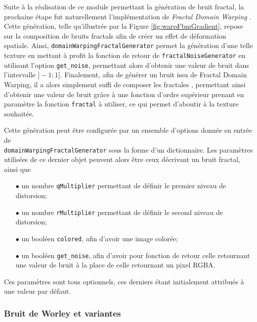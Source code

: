 \documentclass[11pt]{article}
\begin{document}
Suite à la réalisation de ce module permettant la génération de bruit fractal, la prochaine étape fut naturellement l'implémentation de \textit{Fractal Domain Warping} \cite{fractalDomainWarping}. Cette génération, telle qu'illustrée par la Figure \ref{fig:warpFbmGradient}, repose sur la composition de bruits fractals afin de créer un effet de déformation spatiale. Ainsi, \texttt{domainWarpingFractalGenerator} permet la génération d'une telle texture en mettant à profit la fonction de retour de \texttt{fractalNoiseGenerator} en utilisant l'option \texttt{get\_noise}, permettant alors d'obtenir une valeur de bruit dans l'intervalle $]-1;1[$. Finalement, afin de générer un bruit issu de Fractal Domain Warping, il a alors simplement suffi de composer les fractales \cite{fractalDomainWarping}, permettant ainsi d'obtenir une valeur de bruit grâce à une fonction d'ordre supérieur prenant en paramètre la fonction \texttt{fractal} à utiliser, ce qui permet d'aboutir à la texture souhaitée.

Cette génération peut être configurée par un ensemble d'options donnée en entrée de\\ \texttt{domainWarpingFractalGenerator} sous la forme d'un dictionnaire. Les paramètres utilisées de ce dernier objet peuvent alors être ceux décrivant un bruit fractal, ainsi que
\begin{itemize}
    \item [$\bullet$] un nombre \texttt{qMultiplier} permettant de définir le premier niveau de distorsion;
    \item [$\bullet$] un nombre \texttt{rMultiplier} permettant de définir le second niveau de distorsion;
    \item [$\bullet$] un booléen \texttt{colored}, afin d'avoir une image colorée;
    \item [$\bullet$] un booléen \texttt{get\_noise}, afin d'avoir pour fonction de retour celle retournant une valeur de bruit à la place de celle retournant un pixel RGBA.
\end{itemize}
Ces paramètres sont tous optionnels, ces derniers étant initialement attribués à une valeur par défaut.

\subsubsection{Bruit de Worley et variantes}
\label{section: worleyNoise}
\end{document}
